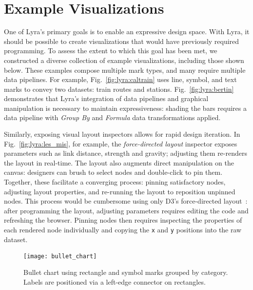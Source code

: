 \vspace{-10pt}

\section{Example Visualizations}

\vspace{-10pt}

One of Lyra's primary goals is to enable an expressive design space. With Lyra,
it should be possible to create visualizations that would have previously
required programming. To assess the extent to which this goal has been met, we
constructed a diverse collection of example visualizations, including those
shown below. These examples compose multiple mark types, and many require
multiple data pipelines. For example, Fig.~\ref{fig:lyra:caltrain} uses line,
symbol, and text marks to convey two datasets: train routes and stations.
Fig.~\ref{fig:lyra:bertin} demonstrates that Lyra's integration of data
pipelines and graphical manipulation is necessary to maintain expressiveness:
shading the bars requires a data pipeline with \emph{Group By} and
\emph{Formula} data transformations applied.

Similarly, exposing visual layout inspectors allows for rapid design iteration.
In Fig.~\ref{fig:lyra:les_mis}, for example, the \emph{force-directed layout}
inspector exposes parameters such as link distance, strength and gravity;
adjusting them re-renders the layout in real-time. The layout also augments
direct manipulation on the canvas: designers can brush to select nodes and
double-click to pin them. Together, these facilitate a converging process:
pinning satisfactory nodes, adjusting layout properties, and re-running the
layout to reposition unpinned nodes. This process would be cumbersome using only
D3's force-directed layout~\cite{bostock:d3}: after programming the layout,
adjusting parameters requires editing the code and refreshing the browser.
Pinning nodes then requires inspecting the properties of each rendered node
individually and copying the \texttt{x} and \texttt{y} positions into the raw
dataset.

\begin{figure}[h!]
  \centering
  \texttt{[image: bullet\_chart]}
  \caption{Bullet chart using rectangle and symbol marks grouped
by category. Labels are positioned via a left-edge connector on rectangles.}
  \label{fig:lyra:bulletChart}
\end{figure}

